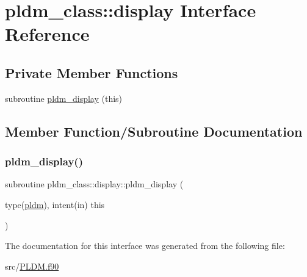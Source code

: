 \hypertarget{interfacepldm__class_1_1display}{}\section{pldm\+\_\+class\+:\+:display Interface Reference}
\label{interfacepldm__class_1_1display}
\subsection*{Private Member Functions}
\begin{DoxyCompactItemize}
\item 
subroutine \hyperlink{interfacepldm__class_1_1display_afb1b71e41434371ec0eaab02cee36d48}{pldm\+\_\+display} (this)
\end{DoxyCompactItemize}


\subsection{Member Function/\+Subroutine Documentation}
\mbox{\label{interfacepldm__class_1_1display_afb1b71e41434371ec0eaab02cee36d48}} 
\subsubsection{\texorpdfstring{pldm\+\_\+display()}{pldm\_display()}}
{\footnotesize\ttfamily subroutine pldm\+\_\+class\+::display\+::pldm\+\_\+display (\begin{DoxyParamCaption}\item[{type(\hyperlink{structpldm__class_1_1pldm}{pldm}), intent(in)}]{this }\end{DoxyParamCaption})\hspace{0.3cm}{\ttfamily [private]}}



The documentation for this interface was generated from the following file\+:\begin{DoxyCompactItemize}
\item 
src/\hyperlink{_p_l_d_m_8f90}{P\+L\+D\+M.\+f90}\end{DoxyCompactItemize}
